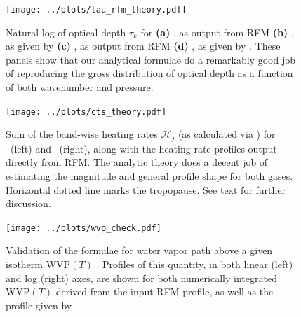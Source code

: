 \documentclass[10pt]{article}
\newcommand{\ch}{\ensuremath{\mathcal{H}}}
\newcommand{\tauk}{\ensuremath{\tau_k}}
\newcommand{\WVP}{\ensuremath{\mathrm{WVP}}}
\begin{document}
\begin{figure}[h!]
	\begin{center}
			\texttt{[image: ../plots/tau\_rfm\_theory.pdf]}
		\caption{Natural log of optical depth $\tauk$ for 
					\textbf{(a)} \htwo, as output from RFM
					\textbf{(b)} \htwo, as given by 
					\textbf{(c)} \cotwo, as output from RFM
					\textbf{(d)}	 \cotwo, as given by .
					These panels show that our analytical formulae  do a remarkably good job of reproducing the gross distribution of optical depth as a function of both wavenumber	and pressure.			
		\label{tau_rfm_theory}
		}
	\end{center}
\end{figure}

\begin{figure}[h!]
	\begin{center}
			\texttt{[image: ../plots/cts\_theory.pdf]}
		\caption{Sum of the band-wise heating rates  $\ch_j$ (as calculated via ) for \htwo\ (left) and \cotwo\ (right), along with the heating rate profiles output directly from RFM. The analytic theory does a decent job of estimating the magnitude and general profile shape for both gases. Horizontal dotted line marks the tropopause. See text for further discussion.
		\label{cts_theory}
		}
	\end{center}
\end{figure}

\begin{figure}[h!]
	\begin{center}
			\texttt{[image: ../plots/wvp\_check.pdf]}
		\caption{Validation of the formulae  for water vapor path above a given isotherm $\WVP(T)$ . Profiles of this quantity, in both linear (left) and log (right) axes, are shown for both numerically integrated $\WVP(T)$ derived from the input RFM profile, as well as the profile given by .  
		\label{wvp_check}
		}
	\end{center}
\end{figure}


\pagebreak



\end{document}
